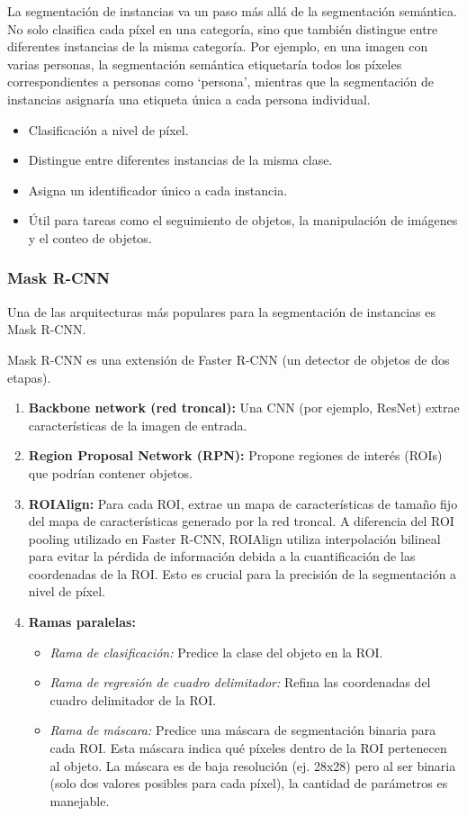 \documentclass{article}
\begin{document}
La segmentación de instancias va un paso más allá de la segmentación semántica.  No solo clasifica cada píxel en una categoría, sino que también distingue entre diferentes instancias de la misma categoría.  Por ejemplo, en una imagen con varias personas, la segmentación semántica etiquetaría todos los píxeles correspondientes a personas como `persona', mientras que la segmentación de instancias asignaría una etiqueta única a cada persona individual.

\begin{itemize}
    \item Clasificación a nivel de píxel.
    \item Distingue entre diferentes instancias de la misma clase.
    \item Asigna un identificador único a cada instancia.
    \item Útil para tareas como el seguimiento de objetos, la manipulación de imágenes y el conteo de objetos.
\end{itemize}

\subsubsection{Mask R-CNN}

Una de las arquitecturas más populares para la segmentación de instancias es Mask R-CNN.

Mask R-CNN es una extensión de Faster R-CNN (un detector de objetos de dos etapas).

\begin{enumerate}
    \item \textbf{Backbone network (red troncal):} Una CNN (por ejemplo, ResNet) extrae características de la imagen de entrada.
    \item \textbf{Region Proposal Network (RPN):} Propone regiones de interés (ROIs) que podrían contener objetos.
    \item \textbf{ROIAlign:}  Para cada ROI, extrae un mapa de características de tamaño fijo del mapa de características generado por la red troncal.  A diferencia del ROI pooling utilizado en Faster R-CNN, ROIAlign utiliza interpolación bilineal para evitar la pérdida de información debida a la cuantificación de las coordenadas de la ROI.  Esto es crucial para la precisión de la segmentación a nivel de píxel.
    \item \textbf{Ramas paralelas:}
        \begin{itemize}
            \item \textit{Rama de clasificación:} Predice la clase del objeto en la ROI.
            \item \textit{Rama de regresión de cuadro delimitador:} Refina las coordenadas del cuadro delimitador de la ROI.
            \item \textit{Rama de máscara:} Predice una máscara de segmentación binaria para cada ROI. Esta máscara indica qué píxeles dentro de la ROI pertenecen al objeto. La máscara es de baja resolución (ej. 28x28) pero al ser binaria (solo dos valores posibles para cada píxel), la cantidad de parámetros es manejable.
        \end{itemize}
\end{enumerate}
\end{document}
